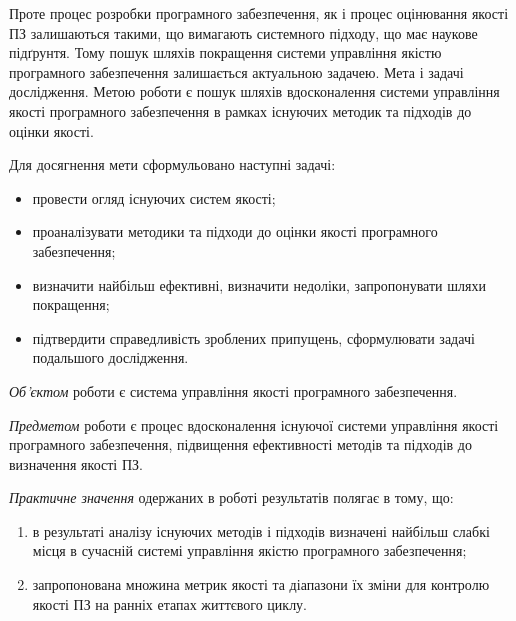 Проте процес розробки програмного забезпечення, як і процес оцінювання якості ПЗ залишаються такими, що вимагають системного підходу, що має наукове підґрунтя. Тому пошук шляхів покращення системи управління якістю програмного забезпечення залишається актуальною задачею.
Мета і задачі дослідження. Метою роботи є пошук шляхів вдосконалення системи управління якості програмного забезпечення в рамках існуючих методик та підходів до оцінки якості.

Для досягнення мети сформульовано наступні задачі:
\begin{itemize}
\item	провести огляд існуючих систем якості;
\item	проаналізувати методики та підходи до оцінки якості програмного забезпечення;
\item	визначити найбільш ефективні, визначити недоліки, запропонувати шляхи покращення;
\item	підтвердити справедливість зроблених припущень, сформулювати задачі подальшого дослідження.
\end{itemize}

\textit{Об’єктом} роботи є система управління якості програмного забезпечення.

\textit{Предметом} роботи є процес вдосконалення існуючої системи управління якості програмного забезпечення, підвищення ефективності методів та підходів до визначення якості ПЗ.

\textit{Практичне значення} одержаних в роботі результатів полягає в тому, що:
\begin{enumerate}
\item	в результаті аналізу існуючих методів і підходів визначені найбільш слабкі місця в сучасній системі управління якістю програмного забезпечення;
\item	запропонована множина метрик якості та діапазони їх зміни для контролю якості ПЗ на ранніх етапах життєвого циклу.
\end{enumerate}
